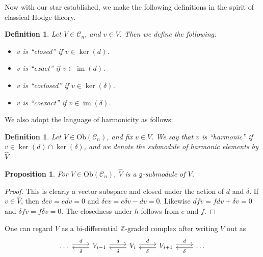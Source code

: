 \documentclass{amsart}
\newcommand{\Z}{\mathbb{Z}}
\newtheorem{definition}[theorem]{Definition}
\newtheorem{prop}[theorem]{Proposition}
\theoremstyle{definition}
\DeclareMathOperator{\im}{im}
\begin{document}
  Now with our star established, we make the following definitions in the spirit of classical Hodge theory.
 \begin{definition}
    Let $V \in \mathscr{C}_n$, and $v \in V$. Then we define the following:
    \begin{itemize}
        \item $v$ is ``closed'' if $v \in \ker(d)$.
        \item $v$ is ``exact'' if $v \in \im(d)$.
        \item $v$ is ``coclosed'' if $v \in \ker(\delta)$.
        \item $v$ is ``coexact'' if $v \in \im (\delta)$.
    \end{itemize}
\end{definition}
 We also adopt the language of harmonicity as follows:
 \begin{definition}
     Let $V \in \mathrm{Ob}(\mathscr{C}_n)$, and fix $v \in V$. We say that $v$ is ``harmonic'' if $v \in \ker(d) \cap \ker(\delta)$, and we denote the submodule of harmonic elements by $\widehat{V}$.
 \end{definition}
\begin{prop}
 For $V \in \mathrm{Ob}(\mathscr{C}_n)$, $\widehat{V}$ is a $\mathfrak{g}$-submodule of $V$.
\end{prop}
\begin{proof}
    This is clearly a vector subspace and closed under the action of $d$ and $\delta$. If $v \in \widehat{V}$, then $dev=edv=0$ and $\delta ev = e\delta v -dv=0$. Likewise $dfv = fdv+\delta v=0$ and $\delta f v= f \delta v=0$. The closedness under $h$ follows from $e$ and $f$.
\end{proof}
One can regard $V$ as a bi-differential $\Z$-graded complex after writing $V$ out as
\[\begin{tikzcd}[ampersand replacement=\&]
	\dots \& {V_{i-1}} \& {V_i} \& {V_{i+1}} \& \dots
	\arrow["d", shift left, from=1-1, to=1-2]
	\arrow["d", shift left, from=1-2, to=1-3]
	\arrow["d", shift left, from=1-3, to=1-4]
	\arrow["d", shift left, from=1-4, to=1-5]
	\arrow["\delta", shift left, from=1-5, to=1-4]
	\arrow["\delta", shift left, from=1-4, to=1-3]
	\arrow["\delta", shift left, from=1-3, to=1-2]
	\arrow["\delta", shift left, from=1-2, to=1-1]
\end{tikzcd}\]
\end{document}
